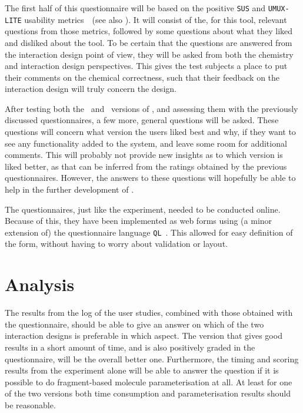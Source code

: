 The first half of this questionnaire will be based on the positive \verb|SUS| and \verb|UMUX-LITE| usability metrics~\cite{lewis2013umux}~(see also ). It will consist of the, for this tool, relevant questions from those metrics, followed by some questions about what they liked and disliked about the tool. To be certain that the questions are answered from the interaction design point of view, they will be asked from both the chemistry and interaction design perspectives. This gives the test subjects a place to put their comments on the chemical correctness, such that their feedback on the interaction design will truly concern the design.

After testing both the \IDa\ and \IDb\ versions of \oframp, and assessing them with the previously discussed questionnaires, a few more, general questions will be asked. These questions will concern what version the users liked best and why, if they want to see any functionality added to the system, and leave some room for additional comments. This will probably not provide new insights as to which version is liked better, as that can be inferred from the ratings obtained by the previous questionnaires. However, the answers to these questions will hopefully be able to help in the further development of \oframp.

The questionnaires, just like the experiment, needed to be conducted online. Because of this, they have been implemented as web forms using (a minor extension of) the questionnaire language \verb|QL|~\cite{erdweg2013state}. This allowed for easy definition of the form, without having to worry about validation or layout.



\section{Analysis}
The results from the log of the user studies, combined with those obtained with the questionnaire, should be able to give an answer on which of the two interaction designs is preferable in which aspect. The version that gives good results in a short amount of time, and is also positively graded in the questionnaire, will be the overall better one. Furthermore, the timing and scoring results from the experiment alone will be able to answer the question if it is possible to do fragment-based molecule parameterisation at all. At least for one of the two versions both time consumption and parameterisation results should be reasonable.

